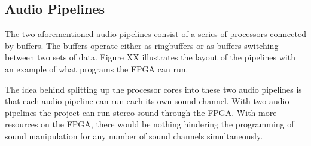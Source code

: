 \FloatBarrier
\subsection{Audio Pipelines}\label{subsec:audio_pipelines}


The two aforementioned audio pipelines consist of a series of processors
connected by buffers. The buffers operate either as ringbuffers or as buffers
switching between two sets of data. Figure XX illustrates the layout of the pipelines with an example of what programs the
FPGA can run.

The idea behind splitting up the processor cores into these two audio pipelines
is that each audio pipeline can run each its own sound channel. With two
audio pipelines the project can run stereo sound through the FPGA. With more
resources on the FPGA, there would be nothing hindering the programming of
sound manipulation for any number of sound channels simultaneously.

